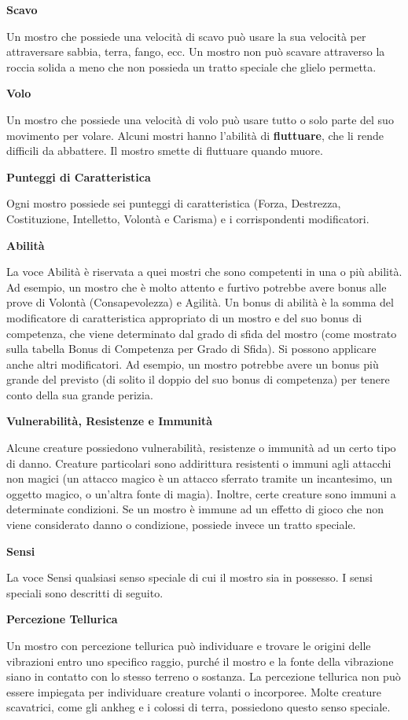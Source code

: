 \begin{multicols}{2}
\textbf{Scavo}

Un mostro che possiede una velocità di scavo può usare la sua velocità
per attraversare sabbia, terra, fango, ecc. Un mostro non può scavare
attraverso la roccia solida a meno che non possieda un tratto speciale
che glielo permetta.

\textbf{Volo}

Un mostro che possiede una velocità di volo può usare tutto o solo parte
del suo movimento per volare. Alcuni mostri hanno l'abilità di
\textbf{fluttuare}, che li rende difficili da abbattere. Il mostro
smette di fluttuare quando muore.

\textbf{Punteggi di Caratteristica}

Ogni mostro possiede sei punteggi di caratteristica (Forza, Destrezza,
Costituzione, Intelletto, Volontà e Carisma) e i corrispondenti
modificatori.


\textbf{Abilità}

La voce Abilità è riservata a quei mostri che sono competenti in una o
più abilità. Ad esempio, un mostro che è molto attento e furtivo
potrebbe avere bonus alle prove di Volontà (Consapevolezza) e Agilità. Un bonus di abilità è la somma del modificatore di
caratteristica appropriato di un mostro e del suo bonus di competenza,
che viene determinato dal grado di sfida del mostro (come mostrato sulla
tabella Bonus di Competenza per Grado di Sfida). Si possono applicare
anche altri modificatori. Ad esempio, un mostro potrebbe avere un bonus
più grande del previsto (di solito il doppio del suo bonus di
competenza) per tenere conto della sua grande perizia.

\textbf{Vulnerabilità, Resistenze e Immunità}

Alcune creature possiedono vulnerabilità, resistenze o immunità ad un
certo tipo di danno. Creature particolari sono addirittura resistenti o
immuni agli attacchi non magici (un attacco magico è un attacco sferrato
tramite un incantesimo, un oggetto magico, o un'altra fonte di magia).
Inoltre, certe creature sono immuni a determinate condizioni. Se un
mostro è immune ad un effetto di gioco che non viene considerato danno o
condizione, possiede invece un tratto speciale.

\textbf{Sensi}

La voce Sensi qualsiasi senso speciale di cui il mostro sia in possesso. I
sensi speciali sono descritti di seguito.

\textbf{Percezione Tellurica}

Un mostro con percezione tellurica può individuare e trovare le origini
delle vibrazioni entro uno specifico raggio, purché il mostro e la fonte
della vibrazione siano in contatto con lo stesso terreno o sostanza. La
percezione tellurica non può essere impiegata per individuare creature
volanti o incorporee. Molte creature scavatrici, come gli ankheg e i
colossi di terra, possiedono questo senso speciale.


\end{multicols}
